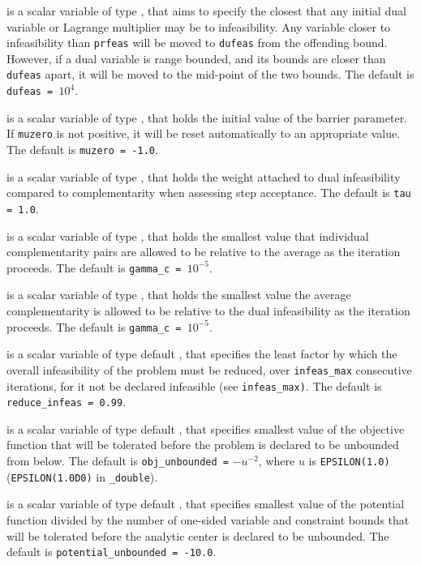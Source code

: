 \begin{description}
 is a scalar variable of type \realdp, that aims to specify
the closest that any initial dual variable or Lagrange multiplier may be to
infeasibility. Any variable closer to infeasibility than {\tt prfeas} will be
moved to {\tt dufeas} from the offending bound. However, if a dual variable
is range bounded, and its bounds are closer than {\tt dufeas} apart, it will
be moved to the mid-point of the two bounds.
The default is {\tt dufeas = $10^4$}.

  is a scalar variable of type \realdp, that holds the
initial value of the barrier parameter. If {\tt muzero} is
not positive, it will be reset automatically to an appropriate value.
The default is {\tt muzero = -1.0}.

  is a scalar variable of type \realdp, that holds the
weight attached to dual infeasibility compared to complementarity
when assessing step acceptance.
The default is {\tt tau = 1.0}.

  is a scalar variable of type \realdp, that holds the
smallest value that individual complementarity pairs are allowed
to be relative to the average as the iteration proceeds.
The default is {\tt gamma\_c = $10^{-5}$}.

  is a scalar variable of type \realdp, that holds the
smallest value the average complementarity is allowed
to be relative to the dual infeasibility as the iteration proceeds.
The default is {\tt gamma\_c = $10^{-5}$}.

  is a scalar variable of type default
\realdp, that specifies the
least factor by which the overall infeasibility of the problem must be reduced,
over {\tt infeas\_max} consecutive iterations,
for it not be declared infeasible (see {\tt infeas\_max)}.
The default is {\tt reduce\_infeas = 0.99}.

  is a scalar variable of type default
\realdp, that specifies smallest
value of the objective function that will be tolerated before the problem
is declared to be unbounded from below.
The default is {\tt obj\_u\-nbounded =} $-u^{-2}$,
where $u$ is {\tt EPSILON(1.0)} ({\tt EPSILON(1.0D0)} in
{\tt \fullpackagename\_double}).

  is a scalar variable of type default
\realdp, that specifies smallest
value of the potential function divided by the number of one-sided variable and
constraint bounds that will be tolerated before the analytic center is
declared to be unbounded.
The default is {\tt potential\_u\-nbounded = -10.0}.


\end{description}
